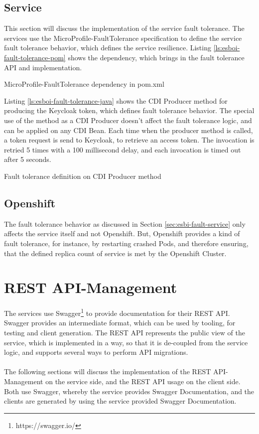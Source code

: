 \subsection{Service}
\label{sec:esbi-fault-service}
This section will discuss the implementation of the service fault tolerance. The services use the MicroProfile-FaultTolerance specification to define the service fault tolerance behavior, which defines the service resilience. Listing \vref{ls:esboi-fault-tolerance-pom} shows the dependency, which brings in the fault tolerance API and implementation.

\begin{listing}[h]
	\caption{MicroProfile-FaultTolerance dependency in pom.xml}
	\label{ls:esboi-fault-tolerance-pom}
\end{listing}

Listing \vref{ls:esboi-fault-tolerance-java} shows the CDI Producer method for producing the Keycloak token, which defines fault tolerance behavior. The special use of the method as a CDI Producer doesn't affect the fault tolerance logic, and can be applied on any CDI Bean. Each time when the producer method is called, a token request is send to Keycloak, to retrieve an access token. The invocation is retried 5 times with a 100 millisecond delay, and each invocation is timed out after 5 seconds.

\begin{listing}[h]
	\caption{Fault tolerance definition on CDI Producer method}
	\label{ls:esboi-fault-tolerance-java}
\end{listing} 

\subsection{Openshift}
\label{sec:esbi-fault-openshift}
The fault tolerance behavior as discussed in Section \vref{sec:esbi-fault-service} only affects the service itself and not Openshift. But, Openshift provides a kind of fault tolerance, for instance, by restarting crashed Pods, and therefore ensuring, that the defined replica count of service is met by the Openshift Cluster.

\section{REST API-Management}
\label{sec:esbi-api}
The services use Swagger\footnote{https://swagger.io/} to provide documentation for their REST API. Swagger provides an intermediate format, which can be used by tooling, for testing and client generation. The REST API represents the public view of the service, which is implemented in a way, so that it is de-coupled from the service logic, and supports several ways to perform API migrations.
\\ \\
The following sections will discuss the implementation of the REST API-Management on the service side, and the REST API usage on the client side. Both use Swagger, whereby the service provides Swagger Documentation, and the clients are generated by using the service provided Swagger Documentation.

